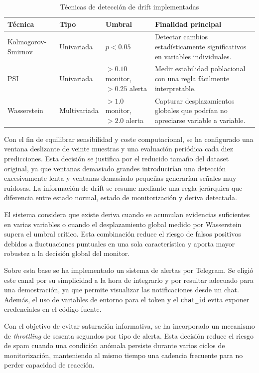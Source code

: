 \begin{table}[h]
\centering
\caption{Técnicas de detección de drift implementadas}
\vspace{0.2cm}
\begin{tabular}{l l l p{5.7cm}}
\hline
\textbf{Técnica} & \textbf{Tipo} & \textbf{Umbral} & \textbf{Finalidad principal} \\
\hline
Kolmogorov-Smirnov & Univariada & \(p < 0.05\) & Detectar cambios estadísticamente significativos en variables individuales. \\
PSI & Univariada & \(>0.10\) monitor, \(>0.25\) alerta & Medir estabilidad poblacional con una regla fácilmente interpretable. \\
Wasserstein & Multivariada & \(>1.0\) monitor, \(>2.0\) alerta & Capturar desplazamientos globales que podrían no apreciarse variable a variable. \\
\hline
\end{tabular}
\label{tab:drift_tecnicas_hito5}
\end{table}

Con el fin de equilibrar sensibilidad y coste computacional, se ha configurado una ventana deslizante de veinte muestras y una evaluación periódica cada diez predicciones. Esta decisión se justifica por el reducido tamaño del dataset original, ya que ventanas demasiado grandes introducirían una detección excesivamente lenta y ventanas demasiado pequeñas generarían señales muy ruidosas. La información de drift se resume mediante una regla jerárquica que diferencia entre estado normal, estado de monitorización y deriva detectada.

El sistema considera que existe deriva cuando se acumulan evidencias suficientes en varias variables o cuando el desplazamiento global medido por Wasserstein supera el umbral crítico. Esta combinación reduce el riesgo de falsos positivos debidos a fluctuaciones puntuales en una sola característica y aporta mayor robustez a la decisión global del monitor.

Sobre esta base se ha implementado un sistema de alertas por Telegram. Se eligió este canal por su simplicidad a la hora de integrarlo y por resultar adecuado para una demostración, ya que permite visualizar las notificaciones desde un chat. Además, el uso de variables de entorno para el token y el \texttt{chat\_id} evita exponer credenciales en el código fuente.

Con el objetivo de evitar saturación informativa, se ha incorporado un mecanismo de \textit{throttling} de sesenta segundos por tipo de alerta. Esta decisión reduce el riesgo de spam cuando una condición anómala persiste durante varios ciclos de monitorización, manteniendo al mismo tiempo una cadencia frecuente para no perder capacidad de reacción.


